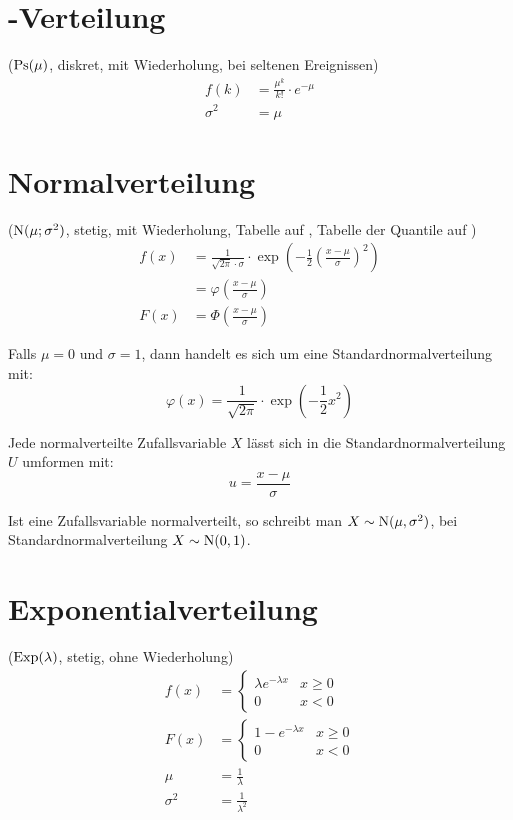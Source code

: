 \section{\protect{}-Verteilung}

($\operatorname{Ps}(\mu)$, diskret, mit Wiederholung, bei seltenen Ereignissen)
\begin{align*}
  f(k)       & =\frac{\mu^{k}}{k!}\cdot e^{-\mu}\\
  \sigma^{2} & =\mu
\end{align*}


\section{Normalverteilung}

($\operatorname{N}(\mu;\sigma^{2})$, stetig, mit Wiederholung, Tabelle auf , Tabelle der Quantile auf )
\begin{align*}
  f(x) & =\frac{1}{\sqrt{2\pi}\cdot\sigma}\cdot\exp\left(-\frac{1}{2}\left(\frac{x-\mu}{\sigma}\right)^{2}\right)\\
       & =\varphi\left(\frac{x-\mu}{\sigma}\right)\\
  F(x) & =\Phi\left(\frac{x-\mu}{\sigma}\right)
\end{align*}

Falls $\mu=0$ und $\sigma=1$, dann handelt es sich um eine Standardnormalverteilung mit:
\[ \varphi(x) = \frac{1}{\sqrt{2\pi}}\cdot\exp\left(-\frac{1}{2}x^{2}\right) \]

Jede normalverteilte Zufallsvariable $X$ lässt sich in die Standardnormalverteilung $U$ umformen mit: \[ u=\frac{x-\mu}{\sigma} \]

Ist eine Zufallsvariable normalverteilt, so schreibt man $X\sim\operatorname{N}(\mu,\sigma^{2})$, bei Standardnormalverteilung $X\sim\operatorname{N}(0,1)$.


\section{Exponentialverteilung}

($\operatorname{Exp}(\lambda)$, stetig, ohne Wiederholung)
\begin{align*}
  f(x) & =
  \begin{cases}
    \lambda e^{-\lambda x} & x\geq0\\
    0                      & x<0
  \end{cases}\\
  F(x) & =
  \begin{cases}
    1-e^{-\lambda x} & x\geq0\\
    0                & x<0
  \end{cases}\\
  \mu        & =\frac{1}{\lambda}\\
  \sigma^{2} & =\frac{1}{\lambda^{2}}
\end{align*}



